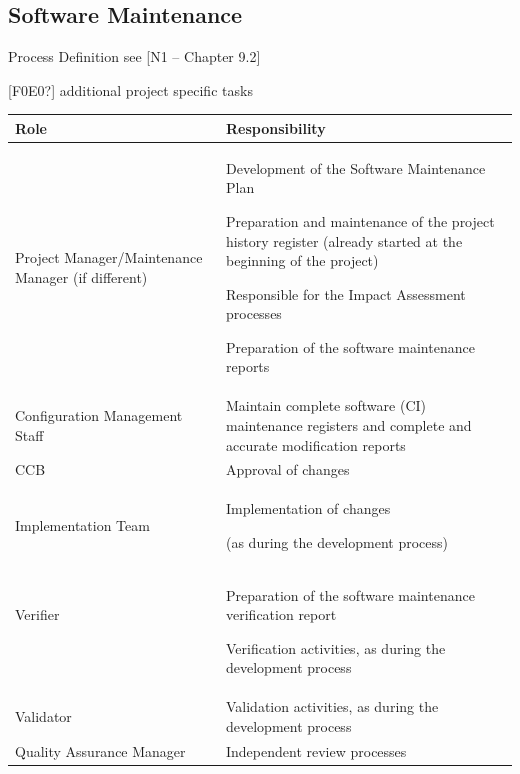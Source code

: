 \documentclass{template/openetcs_article}
\begin{document}
\subsection{Software Maintenance}
Process Definition see [N1 -- Chapter 9.2]

[F0E0?] additional project specific tasks


\begin{flushleft}
\tablefirsthead{}
\tablehead{}
\tabletail{}
\tablelasttail{}
\begin{supertabular}{|m{5cm}|m{9cm}|}
\hline
Role &
Responsibility\\\hline
Project Manager/Maintenance Manager (if different) &
Development of the Software Maintenance Plan

Preparation and maintenance of the project history register (already started at the beginning of the project)

Responsible for the Impact Assessment processes

Preparation of the software maintenance reports\\\hline
Configuration Management Staff &
Maintain complete software (CI) maintenance registers and complete and accurate modification reports\\\hline
CCB &
Approval of changes\\\hline
Implementation Team &
Implementation of changes

(as during the development process)\\\hline
Verifier

~
 &
Preparation of the software maintenance verification report

Verification activities, as during the development process\\\hline
Validator &
Validation activities, as during the development process\\\hline
Quality Assurance Manager &
Independent review processes\\\hline
\end{supertabular}
\end{flushleft}
\end{document}
